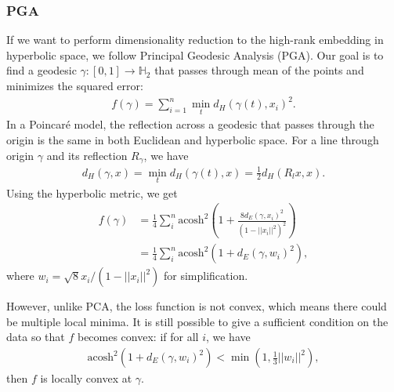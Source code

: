 \subsubsection{PGA}
If we want to perform dimensionality reduction to the high-rank embedding in hyperbolic space, we follow Principal Geodesic Analysis (PGA). Our goal is to find a geodesic $\gamma: [0, 1] \rightarrow \mathbb{H}_2$ that passes through mean of the points and minimizes the squared error:
\begin{align*}
    f(\gamma) = \sum^n_{i=1} \min_t d_H(\gamma(t), x_i)^2. 
\end{align*}
In a Poincar\'e model, the reflection across a geodesic that passes through the origin is the same in both Euclidean and hyperbolic space. For a line through origin $\gamma$ and its reflection $R_\gamma$, we have
\begin{align*}
    d_H(\gamma, x) = \min_t d_H(\gamma(t), x) = \frac{1}{2}d_H(R_l x, x).
\end{align*}
Using the hyperbolic metric, we get 
\begin{align*}
    f(\gamma) &= \frac{1}{4}\sum^n_i \text{acosh}^2(1 + \frac{8d_E(\gamma, x_i)^2}{(1 - ||x_i||^2)^2})\\
    &= \frac{1}{4}\sum^n_i \text{acosh}^2(1 + d_E(\gamma, w_i)^2),
\end{align*}
where $w_i = \sqrt{8}x_i/(1 - ||x_i||^2)$ for simplification. 

However, unlike PCA, the loss function is not convex, which means there could be multiple local minima. It is still possible to give a sufficient condition on the data so that $f$ becomes convex: if for all $i$, we have 
\begin{align*}
    \text{acosh}^2(1 + d_E(\gamma, w_i)^2) < \min(1, \frac{1}{3}||w_i||^2),
\end{align*}
then $f$ is locally convex at $\gamma$. 

